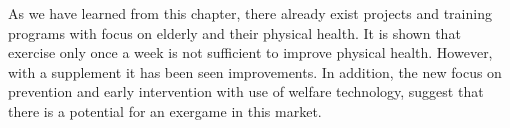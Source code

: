 As we have learned from this chapter, there already exist projects and training programs with focus on elderly and their physical health. It is shown that exercise only once a week is not sufficient to improve physical health. However, with a supplement it has been seen improvements. In addition, the new focus on prevention and early intervention with use of welfare technology, suggest that there is a potential for an exergame in this market. 

